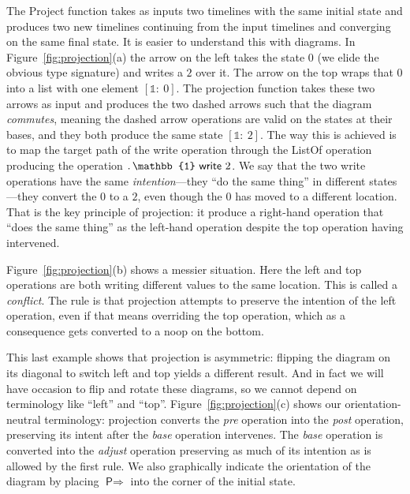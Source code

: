 \documentclass[english,submission]{programming}
\theoremstyle{definition}
\newcommand{\mathbox}[1]{\colorbox{black!10}{$#1$\phantom{i\hspace{-3.5pt}}}}
\newcommand{\is}{{:}\ }
\begin{document}
The \textsf{Project} function takes as inputs two timelines with the same initial state and produces two new timelines continuing from the input timelines and converging on the same final state. It is easier to understand this with diagrams.
In Figure~\ref{fig:projection}(a) the arrow on the left takes the state \mathbox{0} (we elide the obvious type signature) and writes a \mathbox{2} over it. The arrow on the top wraps that \mathbox{0} into a list with one element \mathbox{[\mathbb{1}\is 0]}. The projection function takes these two arrows as input and produces the two dashed arrows such that the diagram \textit{commutes}, meaning the dashed arrow operations are valid on the states at their bases, and they both produce the same state \mathbox{[\mathbb{1}\is 2]}. The way this is achieved is to map the target path of the \textsf{write} operation through the \textsf{ListOf} operation producing the operation \mathbox{\ldotp\mathbb{1} \textsf{ write } 2}. We say that the two \textsf{write} operations have the same \textit{intention}---they ``do the same thing'' in different states---they convert the \mathbox{0} to a \mathbox{2}, even though the \mathbox{0} has moved to a different location. That is the key principle of projection: it produce a right-hand operation that ``does the same thing'' as the left-hand operation despite the top operation having intervened.

Figure~\ref{fig:projection}(b) shows a messier situation. Here the left and top operations are both writing different values to the same location. This is called a \textit{conflict}. The rule is that projection attempts to preserve the intention of the left operation, even if that means overriding the top operation, which as a consequence gets converted to a \textsf{noop} on the bottom.

This last example shows that projection is asymmetric: flipping the diagram on its diagonal to switch left and top yields a different result. And in fact we will have occasion to flip and rotate these diagrams, so we cannot depend on terminology like ``left'' and ``top''. Figure~\ref{fig:projection}(c) shows our orientation-neutral terminology: projection converts the \textit{pre} operation into the \textit{post} operation, preserving its intent after the \textit{base} operation intervenes. The \textit{base} operation is converted into the \textit{adjust} operation preserving as much of its intention as is allowed by the first rule. We also graphically indicate the orientation of the diagram by placing \mathbox{\textsf{P}\!\Rightarrow} into the corner of the initial state.
\end{document}
